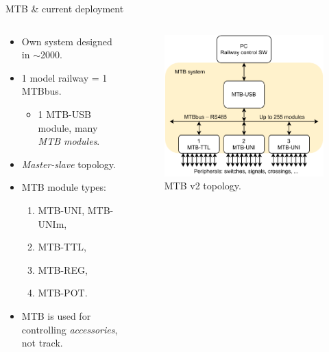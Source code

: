 \documentclass[aspectratio=169]{beamer}
\begin{document}

\begin{frame}{MTB \& current deployment}
\begin{columns}
	\begin{column}{.6\textwidth}
		\begin{itemize}
		\item Own system designed in $\sim$2000.
		\item 1 model railway = 1 MTBbus.
		\begin{itemize}
			\item 1 MTB-USB module, many \textit{MTB modules}.
		\end{itemize}
		\item \textit{Master-slave} topology.
		\item MTB module types:
		\begin{enumerate}
			\item MTB-UNI, MTB-UNIm,
			\item MTB-TTL,
			\item MTB-REG,
			\item MTB-POT.
		\end{enumerate}
		\item MTB is used for controlling \textit{accessories}, not track.
		\end{itemize}
	\end{column}
	\begin{column}{.4\textwidth}
		\begin{figure}
		\includegraphics[width=\columnwidth]{data/mtb-topology-en.pdf}
		\caption{MTB v2 topology.}
		\end{figure}
	\end{column}
\end{columns}
\end{frame}
\end{document}
